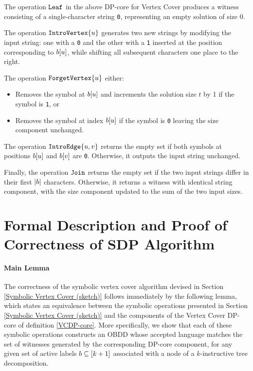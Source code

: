 The operation $\texttt{Leaf}$ in the above DP-core for {\sc Vertex Cover} produces a witness consisting of a single-character string \texttt{0}, representing an empty solution of size 0.

The operation $\texttt{IntroVertex}\{u\}$ generates two new strings by modifying the input string: one with a \texttt{0} and the other with a \texttt{1} inserted at the position corresponding to $b[u]$, while shifting all subsequent characters one place to the right.

The operation $\texttt{ForgetVertex}\{u\}$ either:
\begin{itemize}
    \item Removes the symbol at $b[u]$ and increments the solution size \(t\) by 1 if the symbol is \texttt{1}, or
    \item Removes the symbol at index $b[u]$ if the symbol is \texttt{0} leaving the size component unchanged.
\end{itemize}

The operation $\texttt{IntroEdge}\{u,v\}$ returns the empty set if both symbols at positions $b[u]$ and $b[v]$ are \texttt{0}. Otherwise, it outputs the input string unchanged.

Finally, the operation $\texttt{Join}$ returns the empty set if the two input strings differ in their first $|b|$ characters. Otherwise, it returns a witness with identical string component, with the size component updated to the sum of the two input sizes.


\section{Formal Description and Proof of Correctness of SDP Algorithm}\label{app:ProofofSDP-core}

\paragraph*{Main Lemma}

The correctness of the symbolic vertex cover algorithm devised in Section \ref{Symbolic Vertex Cover (sketch)} follows immediately by the following lemma, which states an equivalence between the symbolic operations presented in Section \ref{Symbolic Vertex Cover (sketch)} and the components of the {\sc Vertex Cover} DP-core of definition \ref{VCDP-core}. More specifically, we show that each of these symbolic operations constructs an OBDD whose accepted language matches the set of witnesses generated by the corresponding DP-core component, for any given set of active labels $b \subseteq [k+1]$ associated with a node of a $k$-instructive tree decomposition.

